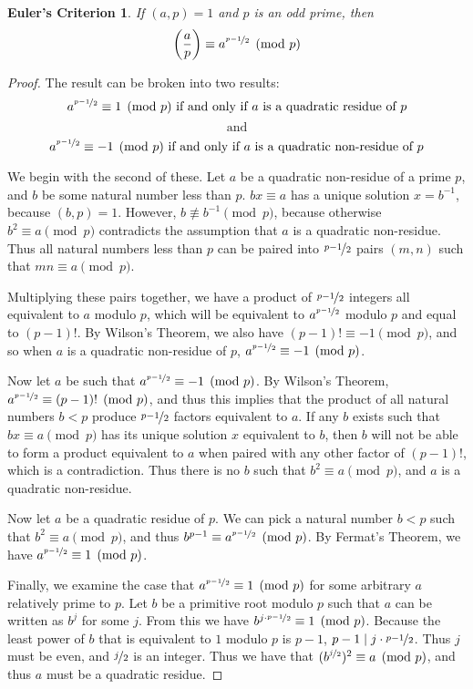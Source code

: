 \documentclass{article}
\theoremstyle{plain}
\begin{document}
\newtheorem*{eulercriterion}{Euler's Criterion}
\begin{eulercriterion}
If $(a,p)  = 1$ and $p$ is an odd prime, then 
	$$ \left( \dfrac{a}{p} \right)  \equiv a^{\nicefrac{p-1}{2}} \pmod p$$
\end{eulercriterion}
\begin{proof}
The result can be broken into two results:
	$$a^{\nicefrac{p-1}{2}} \equiv 1 \pmod p \text{ if and only if } a \text{ is a quadratic residue of } p$$
	$$\text{ and }$$
	$$a^{\nicefrac{p-1}{2}} \equiv -1 \pmod p \text{ if and only if } a \text{ is a quadratic non-residue of } p$$
	
\par We begin with the second of these. Let $a$ be a quadratic non-residue of a prime $p$, and $b$ be some natural number less than $p$. $bx \equiv a$ has a unique solution $x = b^{-1}$, because $(b,p) = 1$. However, $b \not \equiv b^{-1} \pmod p$, because otherwise $b^2 \equiv a \pmod p$ contradicts the assumption that $a$ is a quadratic non-residue. Thus all natural numbers less than $p$ can be paired into $\nicefrac{p-1}{2}$ pairs $(m,n)$ such that $mn \equiv a \pmod p$. 
\par Multiplying these pairs together, we have a product of  $\nicefrac{p-1}{2}$ integers all equivalent to $a$ modulo $p$, which will be equivalent to $a^{\nicefrac{p-1}{2}}$ modulo $p$ and  equal to $(p-1)!$. By Wilson's Theorem, we also have $(p-1)! \equiv -1 \pmod p$, and so when $a$ is a quadratic non-residue of $p$, $a^{\nicefrac{p-1}{2}} \equiv -1 \pmod p$.
\par Now let $a$ be such that $a^{\nicefrac{p-1}{2}} \equiv -1 \pmod p$. By Wilson's Theorem, $a^{\nicefrac{p-1}{2}} \equiv (p-1)! \pmod p$, and thus this implies that the product of all natural  numbers $b < p$ produce $\nicefrac{p-1}{2}$ factors equivalent to $a$. If any $b$ exists such that $bx \equiv
  a \pmod p$ has its unique solution $x$ equivalent to $b$, then $b$ will not be able to form a product equivalent to $a$ when paired with any other
   factor of $(p-1)!$, which is a contradiction. Thus there is no $b$ such that $b^2 \equiv a \pmod p$, and $a$ is a quadratic non-residue.
\par Now let $a$ be a quadratic residue of $p$. We can pick a natural number $b < p$ such that $b^2 \equiv a \pmod p$, and thus $ b^{p-1} \equiv
 a^{\nicefrac{p-1}{2}} \pmod p$. By Fermat's Theorem, we have $ a^{\nicefrac{p-1}{2}} \equiv 1 \pmod p$.
\par Finally, we examine the case that  $a^{\nicefrac{p-1}{2}} \equiv 1 \pmod p$ for some arbitrary $a$ relatively prime to $p$. Let $b$ be a primitive root
 modulo $p$ such that $a$ can be written as $b^j$ for some $j$. From this we have $b^{j \cdot \nicefrac{p-1}{2}} \equiv 1 \pmod p$. Because the least power of $b$ that is equivalent to $1$ modulo $p$ is $p-1$, $p -1 \mid j \cdot \nicefrac{p-1}{2}$. Thus $j$ must be even, and $\nicefrac{j}{2}$ is an integer.
Thus we have that $(b^{\nicefrac{j}{2}})^2 \equiv a \pmod p$, and thus $a$ must be a quadratic residue.
	
\end{proof}
\end{document}

